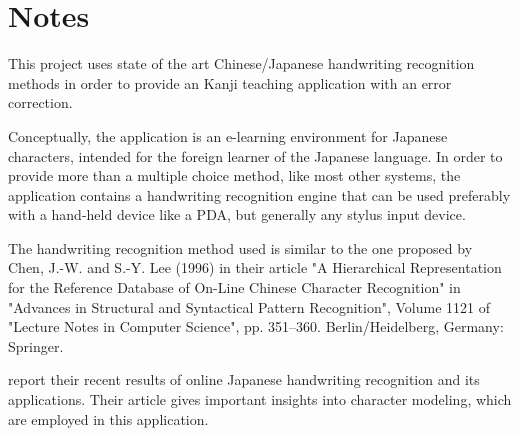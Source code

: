 
\chapter{Notes}

This project uses state of the art Chinese/Japanese handwriting recognition 
methods in order to provide an Kanji teaching application with an error 
correction.

Conceptually, the application is an e-learning environment for Japanese 
characters, intended for the foreign learner of the Japanese language. 
In order to provide more than a  multiple choice method, like most other 
systems, the application contains a handwriting recognition engine that can
be used preferably with a hand-held device like a PDA, but generally any 
stylus input device.

The handwriting recognition method used is similar to the one proposed by Chen, 
J.-W. and S.-Y. Lee (1996) in their article "A Hierarchical Representation for 
the Reference Database of On-Line Chinese Character Recognition" in 
"Advances in Structural and Syntactical Pattern Recognition", Volume
1121 of "Lecture Notes in Computer Science", pp. 351--360. Berlin/Heidelberg, 
Germany: Springer.

\cite{Nakagawa2008} report their recent results of online Japanese 
handwriting recognition and its applications. Their article gives 
important insights into character modeling, which are employed in 
this application.


